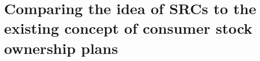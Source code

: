 \documentclass{article}
\begin{document}
\section{Comparing the idea of SRCs to the existing concept of consumer stock ownership plans}


\end{document}
